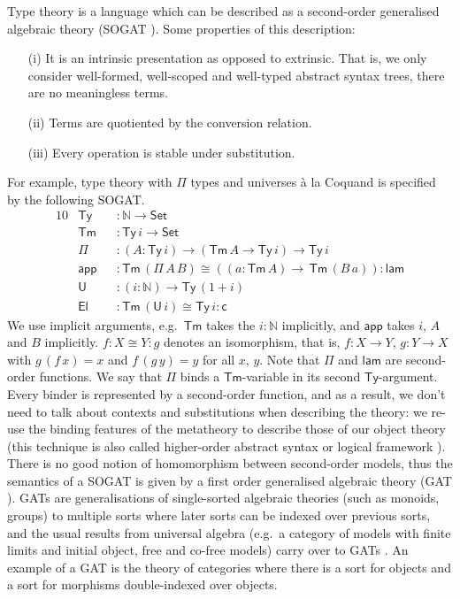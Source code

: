\documentclass[sigplan,10pt,anonymous,review]{acmart}\settopmatter{printfolios=true,printccs=false,printacmref=false}
\newcommand{\ra}{\rightarrow}
\newcommand{\Set}{\mathsf{Set}}
\newcommand{\Ty}{\mathsf{Ty}}
\newcommand{\Tm}{\mathsf{Tm}}
\newcommand{\N}{\mathbb{N}}
\newcommand{\lam}{\mathsf{lam}}
\newcommand{\app}{\mathsf{app}}
\newcommand{\U}{\mathsf{U}}
\newcommand{\El}{\mathsf{El}}
\newcommand{\cd}{\mathsf{c}}
\begin{document}
Type theory is a language which can be described as a second-order
generalised algebraic theory (SOGAT
\cite{DBLP:conf/fscd/KaposiX24}). Some properties of this description:
\begin{enumerate}
\item[(i)] It is an intrinsic presentation
  \cite{DBLP:conf/csl/AltenkirchR99,DBLP:conf/popl/AltenkirchK16} as
  opposed to extrinsic. That is, we only consider well-formed,
  well-scoped and well-typed abstract syntax trees, there are no
  meaningless terms.
\item[(ii)] Terms are quotiented by the conversion relation.
\item[(iii)] Every operation is stable under substitution.
\end{enumerate}
For example, type theory with $\Pi$ types and universes {\`a} la
Coquand \cite{coquandUniverse} is specified by the following SOGAT.
\begin{alignat*}{10}
  & \Ty && : \N\ra\Set \\
  & \Tm && : \Ty\,i\ra\Set \\
  & \Pi && : (A:\Ty\,i)\ra(\Tm\,A\ra\Ty\,i)\ra\Ty\,i \\
  & \app && : \Tm\,(\Pi\,A\,B)\cong((a:\Tm\,A)\ra\,\Tm\,(B\,a)): \lam \\
  & \U && : (i:\N)\ra\Ty\,(1+i) \\
  & \El && : \Tm\,(\U\,i)\cong\Ty\,i : \cd
\end{alignat*}
We use implicit arguments, e.g.\ $\Tm$ takes the $i:\N$ implicitly,
and $\app$ takes $i$, $A$ and $B$ implicitly. $f : X \cong Y : g$
denotes an isomorphism, that is, $f : X\ra Y$, $g:Y\ra X$ with
$g\,(f\,x) = x$ and $f\,(g\,y) = y$ for all $x$, $y$. Note that $\Pi$
and $\lam$ are second-order functions. We say that $\Pi$ binds a
$\Tm$-variable in its second $\Ty$-argument. Every binder is
represented by a second-order function, and as a result, we don't need
to talk about contexts and substitutions when describing the theory:
we re-use the binding features of the metatheory to describe those of
our object theory (this technique is also called higher-order abstract
syntax \cite{DBLP:conf/lics/Hofmann99} or logical framework
\cite{DBLP:journals/jacm/HarperHP93,10.1007/978-3-642-14203-1_2}). There
is no good notion of homomorphism between second-order models, thus
the semantics of a SOGAT is given by a first order generalised
algebraic theory (GAT \cite{DBLP:journals/apal/Cartmell86}). GATs are
generalisations of single-sorted algebraic theories (such as monoids,
groups) to multiple sorts where later sorts can be indexed over
previous sorts, and the usual results from universal algebra (e.g.\ a
category of models with finite limits and initial object, free and
co-free models) carry over to GATs
\cite{andras,DBLP:phd/hal/Moeneclaey22}. An example of a GAT is the
theory of categories where there is a sort for objects and a sort for
morphisms double-indexed over objects.
\end{document}
